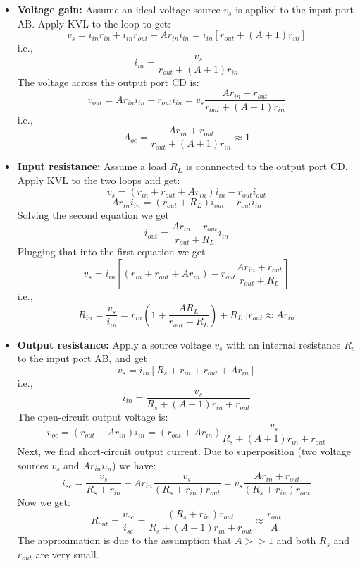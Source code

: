 \usepackage{html}





  \begin{itemize}
    \item {\bf Voltage gain:} Assume an ideal voltage source $v_s$ is applied to the 
      input port AB. Apply KVL to the loop to get:
      \[ v_s=i_{in} r_{in} +i_{in} r_{out} +A r_{in} i_{in}
      =i_{in}[r_{out}+(A+1) r_{in}] \]
      i.e.,
      \[ i_{in}=\frac{v_s}{r_{out}+(A+1) r_{in}} \]
      The voltage across the output port CD is:
      \[ v_{out}=A r_{in} i_{in}+r_{out}i_{in}
      =v_s\frac{A r_{in}+r_{out}}{r_{out}+(A+1) r_{in}} \]
      i.e.,
      \[ A_{oc}=\frac{A r_{in}+r_{out}}{r_{out}+(A+1) r_{in}} \approx 1 \]
  
    \item {\bf Input resistance:} Assume a load $R_L$ is connnected to the output
      port CD. Apply KVL to the two loops and get:
      \[ v_s=(r_{in}+r_{out}+A r_{in})i_{in}-r_{out}i_{out} \]
      \[ Ar_{in}i_{in}=(r_{out}+R_L)i_{out}-r_{out} i_{in} \]
      Solving the second equation we get
      \[ i_{out}=\frac{Ar_{in}+r_{out}}{r_{out}+R_L} i_{in} \]
      Plugging that into the first equation we get
      \[ v_s =i_{in}[(r_{in}+r_{out}+A r_{in})-r_{out}\frac{Ar_{in}+r_{out}}{r_{out}+R_L}] \]
      i.e.,
      \[ R_{in}=\frac{v_s}{i_{in}}=r_{in}(1+\frac{AR_L}{r_{out}+R_L})
      +R_L||r_{out} \approx A r_{in}\]

    \item {\bf Output resistance:} Apply a source voltage $v_s$ with an internal 
      resistance $R_s$ to the input port AB, and get
      \[ v_s=i_{in} [R_s+r_{in}+r_{out} +A r_{in}] \]
      i.e.,
      \[ i_{in}=\frac{v_s}{R_s+(A+1)r_{in}+r_{out}} \]
      The open-circuit output voltage is:
      \[ v_{oc}=(r_{out}+Ar_{in}) i_{in}=(r_{out}+Ar_{in}) \frac{v_s}{R_s+(A+1)r_{in}+r_{out}} \]
      Next, we find short-circuit output current. Due to superposition (two voltage 
      sources $v_s$ and $Ar_{in}i_{in}$) we have:
      \[ i_{sc}=\frac{v_s}{R_s+r_{in}}+Ar_{in}\frac{v_s}{(R_s+r_{in})r_{out}}
      =v_s\frac{Ar_{in}+r_{out}}{(R_s+r_{in})r_{out}} \]
      Now we get:
      \[ R_{out}=\frac{v_{oc}}{i_{sc}}=\frac{(R_s+r_{in})r_{out}}{R_s+(A+1)r_{in}+r_{out}}
      \approx \frac{r_{out}}{A}\]
      The approximation is due to the assumption that $A>>1$ and both $R_s$ and $r_{out}$
      are very small.
	
      
  \end{itemize}



